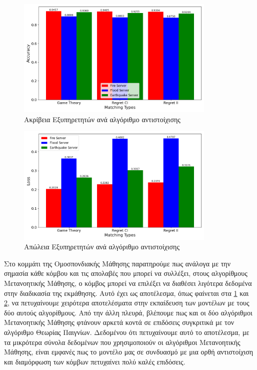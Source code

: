 \begin{figure}[ht]
    \centering
    \includegraphics[width=0.85\textwidth]{figures/chapter4/accuracy_plot.png}
    \caption{Ακρίβεια Εξυπηρετητών ανά αλγόριθμο αντιστοίχισης}
    \label{fig31}
\end{figure}

\begin{figure}[ht]
    \centering
    \includegraphics[width=0.85\textwidth]{figures/chapter4/loss_plot.png}
    \caption{Απώλεια Εξυπηρετητών ανά αλγόριθμο αντιστοίχισης}
    \label{fig32}
\end{figure}

\newpage

Στο κομμάτι της Ομοσπονδιακής Μάθησης παρατηρούμε πως ανάλογα με την σημασία κάθε κόμβου και τις απολαβές που μπορεί να συλλέξει, στους αλγορίθμους Μετανοητικής Μάθησης, ο κόμβος μπορεί να επιλέξει να διαθέσει λιγότερα δεδομένα στην διαδικασία της εκμάθησης. Αυτό έχει ως αποτέλεσμα, όπως φαίνεται στα \ref{fig31} και \ref{fig32}, να πετυχαίνουμε χειρότερα αποτελέσματα στην εκπαίδευση των μοντέλων με τους δύο αυτούς αλγορίθμους. Από την άλλη πλευρά, βλέπουμε πως και οι δύο αλγόριθμοι Μετανοητικής Μάθησης φτάνουν αρκετά κοντά σε επιδόσεις συγκριτικά με τον αλγόριθμο Θεωρίας Παιγνίων. Δεδομένου ότι πετυχαίνουμε αυτό το αποτέλεσμα, με τα μικρότερα σύνολα δεδομένων που χρησιμοποιούν οι αλγόριθμοι Μετανοητικής Μάθησης, είναι εμφανές πως το μοντέλο μας σε συνδυασμό με μια ορθή αντιστοίχιση και διαμόρφωση των κόμβων πετυχαίνει πολύ καλές επιδόσεις.

